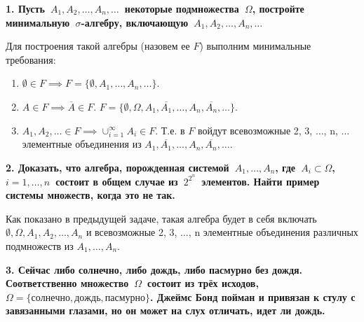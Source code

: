 \documentclass{article}
\begin{document}
\noindent \textbf{1. Пусть $A_1, A_2, \dots, A_n, \dots$ некоторые подмножества $\Omega$, постройте минимальную $\sigma$-алгебру, включающую $A_1, A_2, …, A_n, …$}

Для построения такой алгебры (назовем ее $F$) выполним минимальные требования:

\begin{enumerate}
\item $\emptyset \in F \implies F = \{\emptyset, A_1, \dots, A_n, \dots\}$. 

\item $A \in F \implies \overline{A} \in F$. $F = \{\emptyset, \Omega, A_1, \overline{A_1}, \dots, A_n, \overline{A_n}, \dots\}$. 

\item $A_1, A_2, \dots \in F \implies \cup_{i=1}^{\infty}A_i \in F$. Т.е. в $F$ войдут всевозможные 2, 3, $\dots$, n, $\dots$ элементные объединения из $A_1, \overline{A_1}, \dots, A_n, \overline{A_n}, \dots$.
\end{enumerate}

\noindent \textbf{2. Доказать, что алгебра, порожденная системой $A_1, \dots, A_n$, где $A_i \subset \Omega$,  $i=1,\dots,n$ состоит в общем случае из $2^{2^n}$ элементов. Найти пример системы множеств, когда это не так.}

Как показано в предыдущей задаче, такая алгебра будет в себя включать $\emptyset, \Omega, A_1, A_2, \dots, A_n$ и всевозможные 2, 3, $\dots$, n элементные объединения различных подмножеств из $A_1, \dots, A_n$. 


\noindent \textbf{3. Сейчас либо солнечно, либо дождь, либо пасмурно без дождя. Соответственно множество $\Omega$ состоит из трёх исходов, $\Omega = \{солнечно, дождь, пасмурно\}$. Джеймс Бонд пойман и привязан к стулу с завязанными глазами, но он может на слух отличать, идет ли дождь.}
\end{document}

